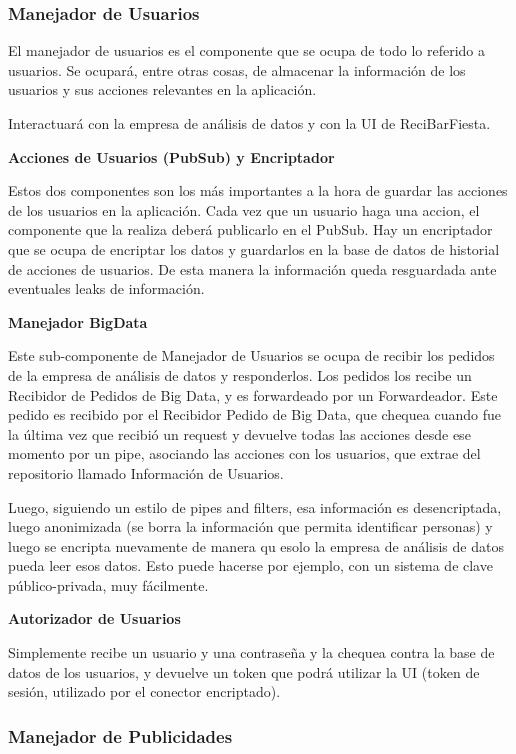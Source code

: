 \subsubsection{Manejador de Usuarios}

El manejador de usuarios es el componente que se ocupa de todo lo referido a usuarios. Se ocupará, entre otras cosas, de almacenar la información de los usuarios y sus acciones relevantes en la aplicación. 

Interactuará con la empresa de análisis de datos y con la UI de ReciBarFiesta.

\textbf{Acciones de Usuarios (PubSub) y Encriptador}

Estos dos componentes son los más importantes a la hora de guardar las acciones de los usuarios en la aplicación. Cada vez que un usuario haga una accion, el componente que la realiza deberá publicarlo en el PubSub. Hay un encriptador que se ocupa de encriptar los datos y guardarlos en la base de datos de historial de acciones de usuarios. De esta manera la información queda resguardada ante eventuales leaks de información.

\textbf{Manejador BigData}

Este sub-componente de Manejador de Usuarios se ocupa de recibir los pedidos de la empresa de análisis de datos y responderlos. Los pedidos los recibe un Recibidor de Pedidos de Big Data, y es forwardeado por un Forwardeador. Este pedido es recibido por el Recibidor Pedido de Big Data, que chequea cuando fue la última vez que recibió un request y devuelve todas las acciones desde ese momento por un pipe, asociando las acciones con los usuarios, que extrae del repositorio
llamado Información de Usuarios.

Luego, siguiendo un estilo de pipes and filters, esa información es desencriptada, luego anonimizada (se borra la información que permita identificar personas) y luego se encripta nuevamente de manera qu esolo la empresa de análisis de datos pueda leer esos datos. Esto puede hacerse por ejemplo, con un sistema de clave público-privada, muy fácilmente.

\textbf{Autorizador de Usuarios}

Simplemente recibe un usuario y una contraseña y la chequea contra la base de datos de los usuarios, y devuelve un token que podrá utilizar la UI (token de sesión, utilizado por el conector encriptado).


\subsubsection{Manejador de Publicidades}

